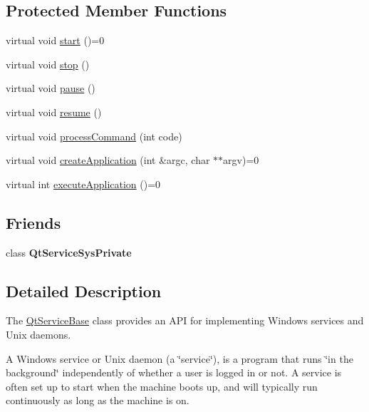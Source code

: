\subsection*{Protected Member Functions}
\begin{DoxyCompactItemize}
\item 
virtual void \hyperlink{class_qt_service_base_adbc0cd621b41bd3a6a1f62fda432e9e4}{start} ()=0
\item 
virtual void \hyperlink{class_qt_service_base_a8d52c1b8fd06b50bdc0a0c6f9936a68e}{stop} ()
\item 
virtual void \hyperlink{class_qt_service_base_a43215a7c5c047d30bcf4f697e6691f89}{pause} ()
\item 
virtual void \hyperlink{class_qt_service_base_aaa2e05ef1c36283b6b35348c3972b489}{resume} ()
\item 
virtual void \hyperlink{class_qt_service_base_a47485f00f6eba0758d2ffc75092295cf}{process\+Command} (int code)
\item 
virtual void \hyperlink{class_qt_service_base_ac5ae73935f489282b35c70b27b341390}{create\+Application} (int \&argc, char $\ast$$\ast$argv)=0
\item 
virtual int \hyperlink{class_qt_service_base_ab70633cd29a22758dfa0502b77e564f6}{execute\+Application} ()=0
\end{DoxyCompactItemize}
\subsection*{Friends}
\begin{DoxyCompactItemize}
\item 
\mbox{\label{class_qt_service_base_a3101d1ae35029ba305c82b8f49512d6f}} 
class {\bfseries Qt\+Service\+Sys\+Private}
\end{DoxyCompactItemize}


\subsection{Detailed Description}
The \hyperlink{class_qt_service_base}{Qt\+Service\+Base} class provides an A\+PI for implementing Windows services and Unix daemons. 

A Windows service or Unix daemon (a \char`\"{}service\char`\"{}), is a program that runs \char`\"{}in the background\char`\"{} independently of whether a user is logged in or not. A service is often set up to start when the machine boots up, and will typically run continuously as long as the machine is on.

